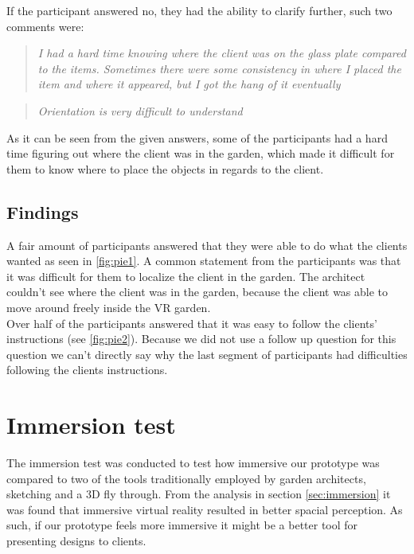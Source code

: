 If the participant answered no, they had the ability to clarify further, such two comments were:\\

 \begin{quote}
 	
\textit{I had a hard time knowing where the client was on the glass plate compared to the items. Sometimes there were some consistency in where I placed the item and where it appeared, but I got the hang of it eventually}\\
  \end{quote}
  
\begin{quote}
\textit{Orientation is very difficult to understand}\\
\end{quote}	
 	 
As it can be seen from the given answers, some of the participants had a hard time figuring out where the client was in the garden, which made it difficult for them to know where to place the objects in regards to the client.


\subsection{Findings}
A fair amount of participants answered that they were able to do what the clients wanted as seen in \ref{fig:pie1}. A common statement from the participants was that it was difficult for them to localize the client in the garden. The architect couldn't see where the client was in the garden, because the client was able to move around freely inside the VR garden.\\

Over half of the participants answered that it was easy to follow the clients' instructions (see \autoref{fig:pie2}). Because we did not use a follow up question for this question we can't directly say why the last segment of participants had difficulties following the clients instructions.\\



\section{Immersion test}
The immersion test was conducted to test how immersive our prototype was compared to two of the tools traditionally employed by garden architects, sketching and a 3D fly through. From the analysis in section \ref{sec:immersion} it was found that immersive virtual reality resulted in better spacial perception. As such, if our prototype feels more immersive it might be a better tool for presenting designs to clients.

